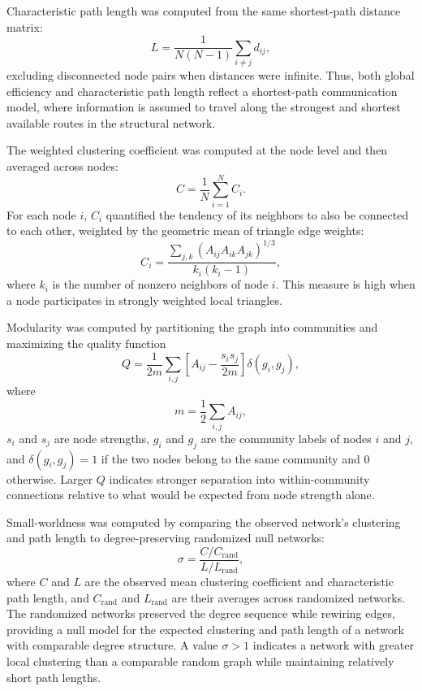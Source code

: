 \documentclass[11pt]{article}
\begin{document}
Characteristic path length was computed from the same shortest-path distance matrix:
\[
L
=
\frac{1}{N(N-1)}
\sum_{i\neq j} d_{ij},
\]
excluding disconnected node pairs when distances were infinite. Thus, both global efficiency and characteristic path length reflect a shortest-path communication model, where information is assumed to travel along the strongest and shortest available routes in the structural network.

The weighted clustering coefficient was computed at the node level and then averaged across nodes:
\[
C
=
\frac{1}{N}
\sum_{i=1}^{N} C_i.
\]
For each node $i$, $C_i$ quantified the tendency of its neighbors to also be connected to each other, weighted by the geometric mean of triangle edge weights:
\[
C_i
=
\frac{
\sum_{j,k}
\left(A_{ij}A_{ik}A_{jk}\right)^{1/3}
}{
k_i(k_i-1)
},
\]
where $k_i$ is the number of nonzero neighbors of node $i$. This measure is high when a node participates in strongly weighted local triangles.

Modularity was computed by partitioning the graph into communities and maximizing the quality function
\[
Q
=
\frac{1}{2m}
\sum_{i,j}
\left[
A_{ij}
-
\frac{s_i s_j}{2m}
\right]
\delta(g_i,g_j),
\]
where
\[
m
=
\frac{1}{2}
\sum_{i,j} A_{ij},
\]
$s_i$ and $s_j$ are node strengths, $g_i$ and $g_j$ are the community labels of nodes $i$ and $j$, and $\delta(g_i,g_j)=1$ if the two nodes belong to the same community and $0$ otherwise. Larger $Q$ indicates stronger separation into within-community connections relative to what would be expected from node strength alone.

Small-worldness was computed by comparing the observed network's clustering and path length to degree-preserving randomized null networks:
\[
\sigma
=
\frac{C/C_{\mathrm{rand}}}{L/L_{\mathrm{rand}}},
\]
where $C$ and $L$ are the observed mean clustering coefficient and characteristic path length, and $C_{\mathrm{rand}}$ and $L_{\mathrm{rand}}$ are their averages across randomized networks. The randomized networks preserved the degree sequence while rewiring edges, providing a null model for the expected clustering and path length of a network with comparable degree structure. A value $\sigma>1$ indicates a network with greater local clustering than a comparable random graph while maintaining relatively short path lengths.
\end{document}
